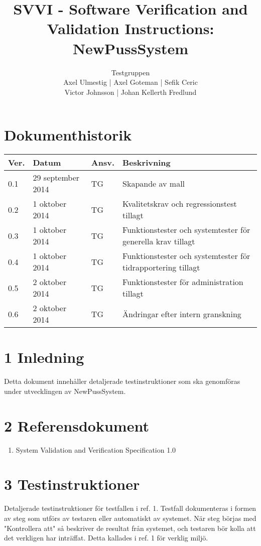 \documentclass[a4paper]{article}
\title{SVVI - Software Verification and Validation Instructions: NewPussSystem}
\author{Testgruppen \\ Axel Ulmestig | Axel Goteman | Sefik Ceric \\ Victor Johnsson | Johan Kellerth Fredlund}
\date{}
\begin{document}
\maketitle
\thispagestyle{fancy}
\tableofcontents
\newpage

\section*{Dokumenthistorik}

\begin{tabular}{ l l l p{9cm} }
Ver. & Datum & Ansv. & Beskrivning \\\hline
0.1 & 29 september 2014 & TG & Skapande av mall \\
0.2 & 1 oktober 2014 & TG & Kvalitetskrav och regressionstest tillagt \\
0.3 & 1 oktober 2014 & TG & Funktionstester och systemtester för generella krav tillagt\\
0.4 & 1 oktober 2014 & TG & Funktionstester och systemtester för tidrapportering tillagt\\
0.5 & 2 oktober 2014 & TG & Funktionstester för administration tillagt\\
0.6 & 2 oktober 2014 & TG & Ändringar efter intern granskning\\

\end{tabular}
\section{1 Inledning}       

Detta dokument innehåller detaljerade testinstruktioner som ska genomföras under utvecklingen av NewPussSystem.

\section{2 Referensdokument}
\begin{enumerate}
\item System Validation and Verification Specification 1.0
\end{enumerate}



\section{3 Testinstruktioner}
Detaljerade testinstruktioner för testfallen i ref. 1. Testfall dokumenteras i formen av steg som utförs av testaren eller automatiskt av systemet. När steg börjas med "Kontrollera att" så beskriver de resultat från systemet, och testaren bör kolla att det verkligen har inträffat. Detta kallades i ref. 1 för verklig miljö.
\end{document}
